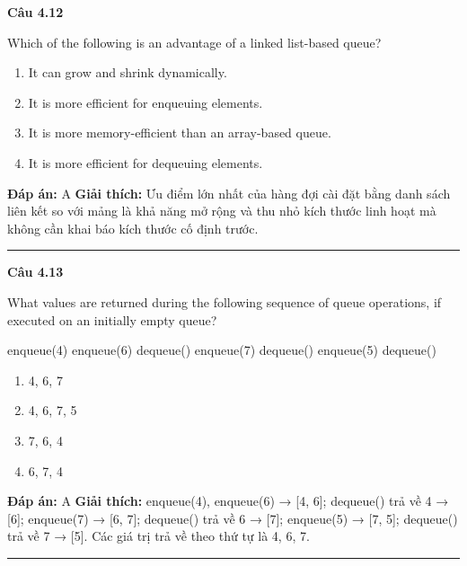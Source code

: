 \documentclass[11pt,a4paper]{article}
\newenvironment{question}[1]{%
  \par\vspace{1em}\noindent\textbf{\large Câu #1}\par\vspace{0.4em}
}{%
  \par\vspace{1em}\hrule\vspace{0.6em}
}
\newenvironment{choices}{%
  \begin{enumerate}[label=\textbf{\Alph*.},leftmargin=2.2em,itemsep=2pt,topsep=3pt]
}{%
  \end{enumerate}
}
\newcommand{\choice}{\item}
\newenvironment{codebox}{%
  \begin{tcolorbox}[colback=gray!8!white,colframe=gray!50!black,arc=1.5mm,boxrule=0.6pt,left=3mm,right=3mm,top=2.5mm,bottom=2.5mm]
  \ttfamily\small
}{%
  \end{tcolorbox}
}
\begin{document}
\begin{question}{4.12}
Which of the following is an advantage of a linked list-based queue?
\begin{choices}
\choice It can grow and shrink dynamically.
\choice It is more efficient for enqueuing elements.
\choice It is more memory-efficient than an array-based queue.
\choice It is more efficient for dequeuing elements.
\end{choices}
\textbf{Đáp án:} A
\textbf{Giải thích:} Ưu điểm lớn nhất của hàng đợi cài đặt bằng danh sách liên kết so với mảng là khả năng mở rộng và thu nhỏ kích thước linh hoạt mà không cần khai báo kích thước cố định trước.
\end{question}

\begin{question}{4.13}
What values are returned during the following sequence of queue operations, if executed on an initially empty queue?
\begin{codebox}
enqueue(4)
enqueue(6)
dequeue()
enqueue(7)
dequeue()
enqueue(5)
dequeue()
\end{codebox}
\begin{choices}
\choice 4, 6, 7
\choice 4, 6, 7, 5
\choice 7, 6, 4
\choice 6, 7, 4
\end{choices}
\textbf{Đáp án:} A
\textbf{Giải thích:} enqueue(4), enqueue(6) → [4, 6]; dequeue() trả về 4 → [6]; enqueue(7) → [6, 7]; dequeue() trả về 6 → [7]; enqueue(5) → [7, 5]; dequeue() trả về 7 → [5]. Các giá trị trả về theo thứ tự là 4, 6, 7.
\end{question}
\end{document}
